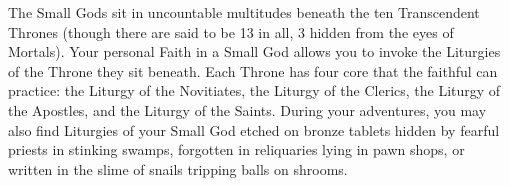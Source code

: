 {

The Small Gods sit in uncountable multitudes beneath the ten Transcendent Thrones (though there are said to be 13 in all, 3 hidden from the eyes of Mortals). Your personal Faith in a Small God allows you to invoke the Liturgies of the Throne they sit beneath. Each Throne has four core  that the faithful can practice: the Liturgy of the Novitiates, the Liturgy of the Clerics, the Liturgy of the Apostles, and the Liturgy of the Saints.  During your adventures, you may also find Liturgies of your Small God etched on bronze tablets hidden by fearful priests in stinking swamps, forgotten in reliquaries lying in pawn shops, or written in the slime of snails tripping balls on shrooms.  


\begin{multicols*}{2}
\raggedcolumns















\cbreak



\end{multicols*}}

